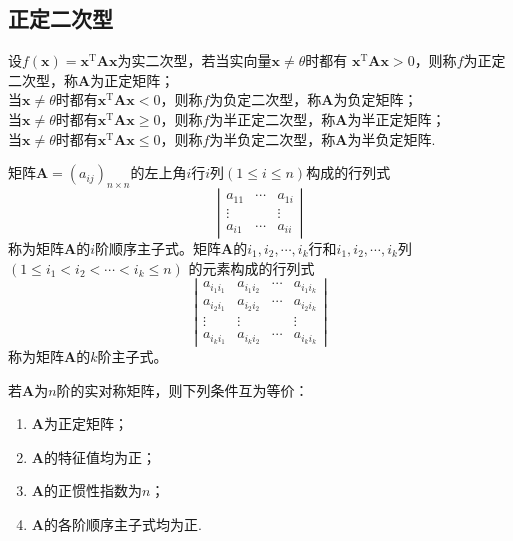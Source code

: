 \subsection{正定二次型}
\begin{definition}
    设$f(\boldsymbol{x})=\boldsymbol{x}^\mathrm{T}\boldsymbol{A}\boldsymbol{x}$为实二次型，若当实向量$\boldsymbol{x}\neq \theta$时都有
    $\boldsymbol{x}^\mathrm{T}\boldsymbol{A}\boldsymbol{x}>0$，则称$f$为{\heiti 正定二次型}，称$\boldsymbol{A}$为{\heiti 正定矩阵}；\\
    当$\boldsymbol{x}\neq \theta$时都有$\boldsymbol{x}^\mathrm{T}\boldsymbol{A}\boldsymbol{x}<0$，则称$f$为{\heiti 负定二次型}，称$\boldsymbol{A}$为{\heiti 负定矩阵}；\\
    当$\boldsymbol{x}\neq \theta$时都有$\boldsymbol{x}^\mathrm{T}\boldsymbol{A}\boldsymbol{x}\geq 0$，则称$f$为{\heiti 半正定二次型}，称$\boldsymbol{A}$为{\heiti 半正定矩阵}；\\
    当$\boldsymbol{x}\neq \theta$时都有$\boldsymbol{x}^\mathrm{T}\boldsymbol{A}\boldsymbol{x}\leq 0$，则称$f$为{\heiti 半负定二次型}，称$\boldsymbol{A}$为{\heiti 半负定矩阵}.
\end{definition}

\begin{definition}[矩阵的顺序主子式和主子式]
    矩阵$\boldsymbol{A}=(a_{ij})_{n\times n}$的左上角$i$行$i$列$(1\leq i\leq n)$构成的行列式
    $$\left|\begin{array}{ccc}
        a_{11} & \cdots &a_{1i}\\
        \vdots & &\vdots\\
        a_{i1} & \cdots & a_{ii}
    \end{array}\right|$$
    称为矩阵$\boldsymbol{A}$的{\heiti $i$阶顺序主子式}。矩阵$\boldsymbol{A}$的$i_1,i_2,\cdots,i_k$行和$i_1,i_2,\cdots,i_k$列$(1\leq i_1<i_2<\cdots<i_k\leq n)$
    的元素构成的行列式
    $$\left|\begin{array}{cccc}
        a_{i_1i_1} & a_{i_1i_2} & \cdots & a_{i_1i_k}\\
        a_{i_2i_1} & a_{i_2i_2} & \cdots & a_{i_2i_k}\\
        \vdots & \vdots &  &\vdots\\
        a_{i_ki_1} & a_{i_ki_2} & \cdots & a_{i_ki_k}
    \end{array}\right|$$
    称为矩阵$\boldsymbol{A}$的{\heiti $k$阶主子式}。
\end{definition}

\begin{theorem}
    若$\boldsymbol{A}$为$n$阶的实对称矩阵，则下列条件互为等价：
    \begin{enumerate}[(1)]
        \item $\boldsymbol{A}$为正定矩阵；
        \item $\boldsymbol{A}$的特征值均为正；
        \item $\boldsymbol{A}$的正惯性指数为$n$；
        \item $\boldsymbol{A}$的各阶顺序主子式均为正.
    \end{enumerate}
\end{theorem}

